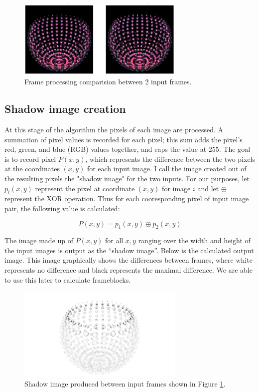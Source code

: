\documentclass[conference]{IEEEtran}
\begin{document}
\begin{figure}[htbp]
\centerline{\includegraphics[width=8cm]{frame_processing.png}}
\caption{Frame processing comparision between 2 input frames.}
\label{fig:frame_processing}
\end{figure}

\subsection{Shadow image creation}
\label{subsec:shadow_image_creation}
At this stage of the algorithm the pixels of each image are processed.
A summation of pixel values is recorded for each pixel;
this sum adds the pixel's red, green, and blue (RGB) values together, and
caps the value at 255.
The goal is to record pixel $P(x,y)$,
which represents the difference between the two
pixels at the coordinates $(x,y)$ for each input image.
I call the image created out of the resulting pixels the "shadow image" for the two inputs.
For our purposes, let $p_i(x,y)$ represent the pixel at coordinate
$(x,y)$ for image $i$ and let $\oplus$ represent the XOR operation.
Thus for each cooresponding pixel of input image pair,
the following value is calculated:

$$P(x,y) = p_1(x,y) \oplus p_2(x,y)$$

The image made up of $P(x,y)$ for all $x,y$ ranging over the width and height of
the input images is output as the ``shadow image''.
Below is the calculated output image.
This image graphically shows the differences between frames,
where white represents no difference and black represents the maximal difference.
We are able to use this later to calculate frameblocks.

\begin{figure}[htbp]
\centerline{\includegraphics[width=8cm]{shadow_image.png}}
\caption{Shadow image produced between input frames shown in Figure
\ref{fig:frame_processing}.}
\label{fig:shadow_image}
\end{figure}
\end{document}
